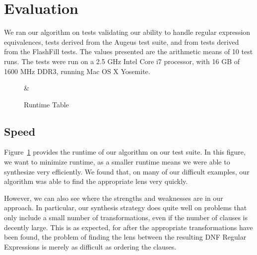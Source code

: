 \section{Evaluation}
We ran our algorithm on tests validating our ability to handle regular
expression equivalences, tests derived from the Augeus test suite, and from
tests derived from the FlashFill tests.
The values presented are the arithmetic means of 10 test runs.
The tests were run on a 2.5 GHz Intel Core i7 processor, with
16 GB of 1600 MHz DDR3, running Mac OS X Yosemite.

\begin{figure}
\centering

{\Test{} & \ComputationTime{}}

\caption{Runtime Table}
\label{fig:runtimes-table}
\end{figure}

\subsection{Speed}
Figure~\ref{fig:runtimes-table} provides the runtime of our algorithm on our
test suite.
In this figure, we want to minimize runtime, as a smaller runtime means we were
able to synthesize very efficiently.
We found that, on many of our difficult examples, our algorithm was able to find
the appropriate lens very quickly.

However, we can also see where the strengths and weaknesses are in our approach.
In particular, our synthesis strategy does quite well on problems that only
include a small number of transformations, even if the number of clauses is
decently large.
This is as expected, for after the appropriate transformations have been found,
the problem of finding the lens between the resulting DNF Regular Expressions
is merely as difficult as ordering the clauses.

